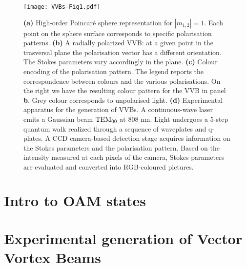 \begin{figure}[t]
	\centering
    \texttt{[image: VVBs-Fig1.pdf]}
    \caption{
    	\textbf{(a)} High-order Poincar\'e sphere representation for $|m_{1,2}|=1$. Each point on the sphere surface corresponds to specific polarisation patterns. 
	    \textbf{(b)} A radially polarized \ac{VVB}: at a given point in the trasversal plane the polarisation vector has a different orientation. The Stokes parameters vary accordingly in the plane.
	    \textbf{(c)} Colour encoding of the polarisation pattern. 
	    The legend reports the correspondence between colours and the various polarisations.
	    On the right we have the resulting colour pattern for the VVB in panel {\bf b}.
	    Grey colour corresponds to unpolarised light.
	    \textbf{(d)} Experimental apparatus for the generation of \acp{VVB}. A continuous-wave laser emits a Gaussian beam ${\rm TEM}_{00}$ at $808$ nm. Light undergoes a 5-step quantum walk realized through a sequence of waveplates and q-plates.
    	A CCD camera-based detection stage acquires information on the Stokes parameters and the polarisation pattern. Based on the intensity measured at each pixels of the  camera, Stokes parameters are evaluated and converted into RGB-coloured pictures.
    }%
    \label{fig:VVBs:poinc_sphere}
\end{figure}


\section{Intro to OAM states}


\section{Experimental generation of Vector Vortex Beams}

